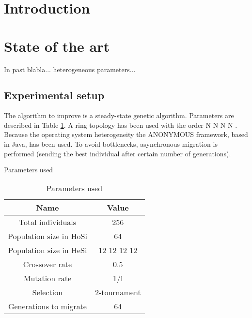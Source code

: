 \documentclass{sig-alternate}
\begin{document}




%
%
\section{Introduction}
\label{sec:intro}
%



%
\section{State of the art}
\label{sec:soa}
%

In past blabla... heterogeneous parameters... \cite{HETEROGENEOUS}


\subsection{Experimental setup}
\label{subsec:experiments}

The algorithm to improve is a steady-state genetic algorithm. Parameters are described in Table \ref{table:parameters}. A ring topology has been used with the order N N N N . Because the operating system heterogeneity the ANONYMOUS framework, based in Java, has been used. To avoid bottlenecks, asynchronous migration is performed (sending the best individual after certain number of generations).


\begin{table}
\centering
\caption{Parameters used}
\begin{tabular}{|c|c|} \hline
Name & Value\\ \hline
Total individuals & 256\\ \hline
Population size in HoSi & 64 \\ \hline
Population size in HeSi & 12 12 12 12\\
Crossover rate & 0.5\\ \hline
Mutation rate & 1/l\\ \hline
Selection & 2-tournament \\ \hline
Generations to migrate & 64 \\
\hline\end{tabular}
\label{table:parameters}
\caption{Parameters used}
\end{table}
\end{document}
